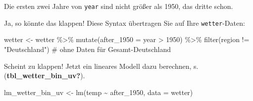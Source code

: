 \documentclass[
  letterpaper,
  oneside,
  open=any]{scrbook}
\newenvironment{Shaded}{\begin{snugshade}}{\end{snugshade}}
\newcommand{\AttributeTok}[1]{\textcolor[rgb]{0.40,0.45,0.13}{#1}}
\newcommand{\CommentTok}[1]{\textcolor[rgb]{0.37,0.37,0.37}{#1}}
\newcommand{\DecValTok}[1]{\textcolor[rgb]{0.68,0.00,0.00}{#1}}
\newcommand{\FunctionTok}[1]{\textcolor[rgb]{0.28,0.35,0.67}{#1}}
\newcommand{\NormalTok}[1]{\textcolor[rgb]{0.00,0.23,0.31}{#1}}
\newcommand{\OtherTok}[1]{\textcolor[rgb]{0.00,0.23,0.31}{#1}}
\newcommand{\SpecialCharTok}[1]{\textcolor[rgb]{0.37,0.37,0.37}{#1}}
\newcommand{\StringTok}[1]{\textcolor[rgb]{0.13,0.47,0.30}{#1}}
\theoremstyle{definition}
\theoremstyle{definition}
\theoremstyle{definition}
\theoremstyle{remark}
\begin{document}
Die ersten zwei Jahre von \texttt{year} sind nicht größer als 1950, das
dritte schon.

Ja, so könnte das klappen! Diese Syntax übertragen Sie auf Ihre
\texttt{wetter}-Daten:

\begin{Shaded}
\begin{Highlighting}[]
\NormalTok{wetter }\OtherTok{\textless{}{-}}
\NormalTok{  wetter }\SpecialCharTok{\%\textgreater{}\%} 
  \FunctionTok{mutate}\NormalTok{(}\AttributeTok{after\_1950 =}\NormalTok{ year }\SpecialCharTok{\textgreater{}} \DecValTok{1950}\NormalTok{) }\SpecialCharTok{\%\textgreater{}\%} 
  \FunctionTok{filter}\NormalTok{(region }\SpecialCharTok{!=} \StringTok{"Deutschland"}\NormalTok{)  }\CommentTok{\# ohne Daten für Gesamt{-}Deutschland}
\end{Highlighting}
\end{Shaded}

Scheint zu klappen! Jetzt ein lineares Modell dazu berechnen, s.
(\textbf{tbl\_wetter\_bin\_uv?}).

\begin{Shaded}
\begin{Highlighting}[]
\NormalTok{lm\_wetter\_bin\_uv }\OtherTok{\textless{}{-}} \FunctionTok{lm}\NormalTok{(temp }\SpecialCharTok{\textasciitilde{}}\NormalTok{ after\_1950, }\AttributeTok{data =}\NormalTok{ wetter)}
\end{Highlighting}
\end{Shaded}
\end{document}
